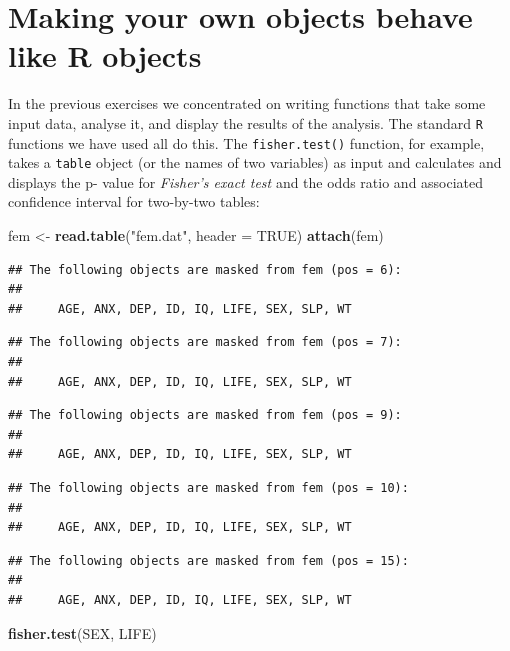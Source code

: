 \documentclass[12pt,a4paper]{book}
\newenvironment{Shaded}{\begin{snugshade}}{\end{snugshade}}
\newcommand{\DataTypeTok}[1]{\textcolor[rgb]{0.13,0.29,0.53}{#1}}
\newcommand{\KeywordTok}[1]{\textcolor[rgb]{0.13,0.29,0.53}{\textbf{#1}}}
\newcommand{\NormalTok}[1]{#1}
\newcommand{\OtherTok}[1]{\textcolor[rgb]{0.56,0.35,0.01}{#1}}
\newcommand{\StringTok}[1]{\textcolor[rgb]{0.31,0.60,0.02}{#1}}
\theoremstyle{definition}
\theoremstyle{definition}
\theoremstyle{definition}
\theoremstyle{remark}
\begin{document}
\hypertarget{exercise6}{%
\chapter{Making your own objects behave like R
objects}\label{exercise6}}

In the previous exercises we concentrated on writing functions that take
some input data, analyse it, and display the results of the analysis.
The standard \texttt{R} functions we have used all do this. The
\texttt{fisher.test()} function, for example, takes a \texttt{table}
object (or the names of two variables) as input and calculates and
displays the p- value for \emph{Fisher's exact test} and the odds ratio
and associated confidence interval for two-by-two tables:

\begin{Shaded}
\begin{Highlighting}[]
\NormalTok{fem <-}\StringTok{ }\KeywordTok{read.table}\NormalTok{(}\StringTok{"fem.dat"}\NormalTok{, }\DataTypeTok{header =} \OtherTok{TRUE}\NormalTok{)}
\KeywordTok{attach}\NormalTok{(fem)}
\end{Highlighting}
\end{Shaded}

\begin{verbatim}
## The following objects are masked from fem (pos = 6):
## 
##     AGE, ANX, DEP, ID, IQ, LIFE, SEX, SLP, WT
\end{verbatim}

\begin{verbatim}
## The following objects are masked from fem (pos = 7):
## 
##     AGE, ANX, DEP, ID, IQ, LIFE, SEX, SLP, WT
\end{verbatim}

\begin{verbatim}
## The following objects are masked from fem (pos = 9):
## 
##     AGE, ANX, DEP, ID, IQ, LIFE, SEX, SLP, WT
\end{verbatim}

\begin{verbatim}
## The following objects are masked from fem (pos = 10):
## 
##     AGE, ANX, DEP, ID, IQ, LIFE, SEX, SLP, WT
\end{verbatim}

\begin{verbatim}
## The following objects are masked from fem (pos = 15):
## 
##     AGE, ANX, DEP, ID, IQ, LIFE, SEX, SLP, WT
\end{verbatim}

\begin{Shaded}
\begin{Highlighting}[]
\KeywordTok{fisher.test}\NormalTok{(SEX, LIFE)}
\end{Highlighting}
\end{Shaded}
\end{document}
